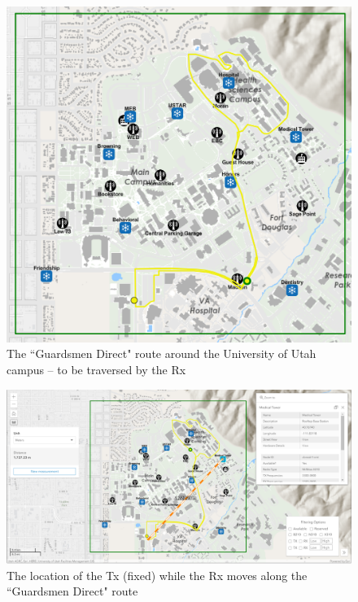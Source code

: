 \documentclass[12pt]{article}
\newcommand{\areaofinterestfigwidth}{1.0\textwidth}
\begin{document}
\begin{itemize}
            \begin{figure}
                \centering
                \includegraphics[width=\areaofinterestfigwidth]{figs/Guardsmen_Direct_Route_1.png}
                \caption{The ``Guardsmen Direct" route around the University of Utah campus -- to be traversed by the Rx}
                \label{fig:Rx_4}
            \end{figure}
            \begin{figure}
                \centering
                \includegraphics[width=\areaofinterestfigwidth]{figs/Guardsmen_Direct_Route_1_Medical_Tower_Tx.png}
                \caption{The location of the Tx (fixed) while the Rx moves along the ``Guardsmen Direct" route}
                \label{fig:Tx_4}

\end{figure}
\end{itemize}
\end{document}
